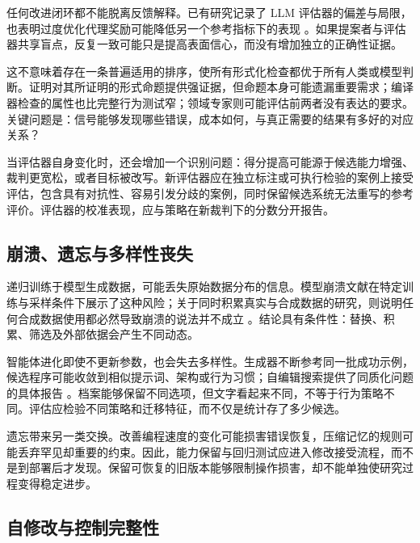 \documentclass[11pt,,]{article}
\begin{document}
任何改进闭环都不能脱离反馈解释。已有研究记录了 LLM
评估器的偏差与局限，也表明过度优化代理奖励可能降低另一个参考指标下的表现
\citep{judge2023, rewardoveropt2022}。如果提案者与评估器共享盲点，反复一致可能只是提高表面信心，而没有增加独立的正确性证据。

这不意味着存在一条普遍适用的排序，使所有形式化检查都优于所有人类或模型判断。证明对其所证明的形式命题提供强证据，但命题本身可能遗漏重要需求；编译器检查的属性也比完整行为测试窄；领域专家则可能评估前两者没有表达的要求。关键问题是：信号能够发现哪些错误，成本如何，与真正需要的结果有多好的对应关系？

当评估器自身变化时，还会增加一个识别问题：得分提高可能源于候选能力增强、裁判更宽松，或者目标被改写。新评估器应在独立标注或可执行检验的案例上接受评估，包含具有对抗性、容易引发分歧的案例，同时保留候选系统无法重写的参考评价。评估器的校准表现，应与策略在新裁判下的分数分开报告。

\hypertarget{ux5d29ux6e83ux9057ux5fd8ux4e0eux591aux6837ux6027ux4e27ux5931}{%
\subsection{崩溃、遗忘与多样性丧失}\label{ux5d29ux6e83ux9057ux5fd8ux4e0eux591aux6837ux6027ux4e27ux5931}}

递归训练于模型生成数据，可能丢失原始数据分布的信息。模型崩溃文献在特定训练与采样条件下展示了这种风险；关于同时积累真实与合成数据的研究，则说明任何合成数据使用都必然导致崩溃的说法并不成立
\citep{collapse2023, accumulate2024}。结论具有条件性：替换、积累、筛选及外部依据会产生不同动态。

智能体进化即使不更新参数，也会失去多样性。生成器不断参考同一批成功示例，候选程序可能收敛到相似提示词、架构或行为习惯；自编辑搜索提供了同质化问题的具体报告
\citep{selfedit2026}。档案能够保留不同选项，但文字看起来不同，不等于行为策略不同。评估应检验不同策略和迁移特征，而不仅是统计存了多少候选。

遗忘带来另一类交换。改善编程速度的变化可能损害错误恢复，压缩记忆的规则可能丢弃罕见却重要的约束。因此，能力保留与回归测试应进入修改接受流程，而不是到部署后才发现。保留可恢复的旧版本能够限制操作损害，却不能单独使研究过程变得稳定进步。

\hypertarget{ux81eaux4feeux6539ux4e0eux63a7ux5236ux5b8cux6574ux6027}{%
\subsection{自修改与控制完整性}\label{ux81eaux4feeux6539ux4e0eux63a7ux5236ux5b8cux6574ux6027}}
\end{document}
